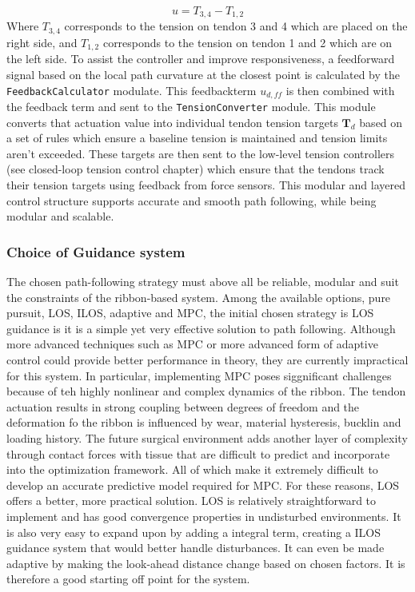 \begin{equation}
    u = T_{3,4} - T_ {1,2}
\end{equation}
Where \(T_{3,4}\) corresponds to the tension on tendon 3 and 4 which are placed on the right side, and \(T_{1,2}\) corresponds to the tension on tendon 1 and 2 which are on the left side. 
\newline \newline
To assist the controller and improve responsiveness, a feedforward signal based on the local path curvature at the closest point is calculated by the \texttt{FeedbackCalculator} modulate. This feedbackterm \(u_{d, ff}\) is then combined with the feedback term and sent to the \texttt{TensionConverter} module. This module converts that actuation value into individual tendon tension targets \(\textbf{T}_d\) based on a set of rules which ensure a baseline tension is maintained and tension limits aren't exceeded. These targets are then sent to the low-level tension controllers (see closed-loop tension control chapter) which ensure that the tendons track their tension targets using feedback from force sensors.
\newline \newline
This modular and layered control structure supports accurate and smooth path following, while being modular and scalable. 


\subsubsection{Choice of Guidance system}
The chosen path-following strategy must above all be reliable, modular and suit the constraints of the ribbon-based system. Among the available options, pure pursuit, LOS, ILOS, adaptive and MPC, the initial chosen strategy is LOS guidance is it is a simple yet very effective solution to path following.
\newline \newline 
Although more advanced techniques such as MPC or more advanced form of adaptive control could provide better performance in theory, they are currently impractical for this system. In particular, implementing MPC poses siggnificant challenges because of teh highly nonlinear and complex dynamics of the ribbon. The tendon actuation results in strong coupling between degrees of freedom and the deformation fo the ribbon is influenced by wear, material hysteresis, bucklin and loading history. The future surgical environment adds another layer of complexity through contact forces with tissue that are difficult to predict and incorporate into the optimization framework. All of which make it extremely difficult to develop an accurate predictive model required for MPC.
\newline \newline
For these reasons, LOS offers a better, more practical solution. LOS is relatively straightforward to implement and has good convergence properties in undisturbed environments. It is also very easy to expand upon by adding a integral term, creating a ILOS guidance system that would better handle disturbances. It can even be made adaptive by making the look-ahead distance change based on chosen factors. It is therefore a good starting off point for the system.

